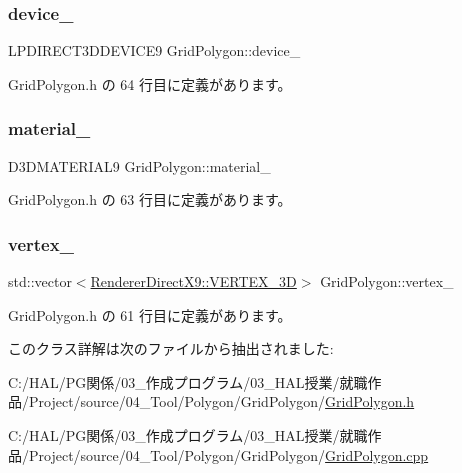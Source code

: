 \subsubsection{\texorpdfstring{device\+\_\+}{device\_}}
{\footnotesize\ttfamily L\+P\+D\+I\+R\+E\+C\+T3\+D\+D\+E\+V\+I\+C\+E9 Grid\+Polygon\+::device\+\_\+\hspace{0.3cm}{\ttfamily [private]}}



 Grid\+Polygon.\+h の 64 行目に定義があります。

\mbox{\label{class_grid_polygon_a5aabcb6eed028eb7b093ce8f4e6936a8}} 
\subsubsection{\texorpdfstring{material\+\_\+}{material\_}}
{\footnotesize\ttfamily D3\+D\+M\+A\+T\+E\+R\+I\+A\+L9 Grid\+Polygon\+::material\+\_\+\hspace{0.3cm}{\ttfamily [private]}}



 Grid\+Polygon.\+h の 63 行目に定義があります。

\mbox{\label{class_grid_polygon_a71923f80b111b2868553f9f3600fa192}} 
\subsubsection{\texorpdfstring{vertex\+\_\+}{vertex\_}}
{\footnotesize\ttfamily std\+::vector$<$\mbox{\hyperlink{class_renderer_direct_x9_1_1_v_e_r_t_e_x__3_d}{Renderer\+Direct\+X9\+::\+V\+E\+R\+T\+E\+X\+\_\+3D}}$>$ Grid\+Polygon\+::vertex\+\_\+\hspace{0.3cm}{\ttfamily [private]}}



 Grid\+Polygon.\+h の 61 行目に定義があります。



このクラス詳解は次のファイルから抽出されました\+:\begin{DoxyCompactItemize}
\item 
C\+:/\+H\+A\+L/\+P\+G関係/03\+\_\+作成プログラム/03\+\_\+\+H\+A\+L授業/就職作品/\+Project/source/04\+\_\+\+Tool/\+Polygon/\+Grid\+Polygon/\mbox{\hyperlink{_grid_polygon_8h}{Grid\+Polygon.\+h}}\item 
C\+:/\+H\+A\+L/\+P\+G関係/03\+\_\+作成プログラム/03\+\_\+\+H\+A\+L授業/就職作品/\+Project/source/04\+\_\+\+Tool/\+Polygon/\+Grid\+Polygon/\mbox{\hyperlink{_grid_polygon_8cpp}{Grid\+Polygon.\+cpp}}\end{DoxyCompactItemize}
